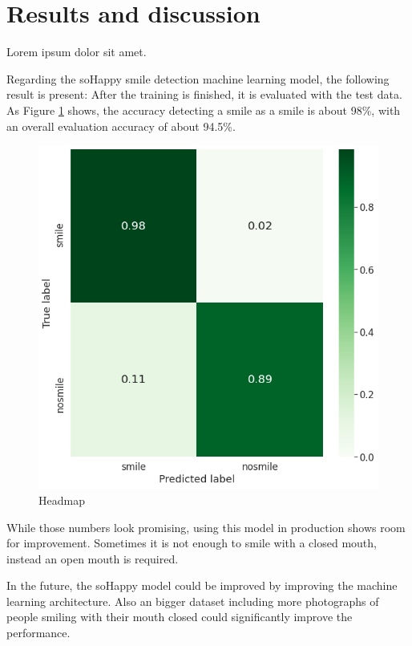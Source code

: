 \section{Results and discussion} \label{sec:results_and_discussion}
Lorem ipsum dolor sit amet.


Regarding the soHappy smile detection machine learning model, the following
result is present: After the training is finished, it is evaluated with the
test data. As Figure \ref{fig:training_result} shows, the accuracy detecting a
smile as a smile is about 98\%, with an overall evaluation accuracy of about 
94.5\%.

\begin{figure}
  \includegraphics[width=\linewidth]{figures/training_result.png}
  \caption{Headmap }
  \label{fig:training_result}
\end{figure}

While those numbers look promising, using this model in production shows
room for improvement. Sometimes it is not enough to smile with a closed
mouth, instead an open mouth is required.

In the future, the soHappy model could be improved by improving the machine 
learning architecture. Also an bigger dataset including more photographs of
people smiling with their mouth closed could significantly improve the 
performance.